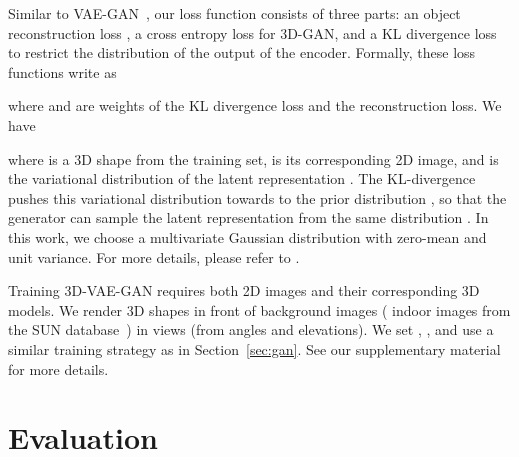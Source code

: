 \documentclass{article}
\newcommand{\sect}[1]{Section~\ref{#1}}
\newcommand{\model}{3D-GAN\xspace}
\newcommand{\vaemodel}{3D-VAE-GAN\xspace}
\newcommand{\presection}{\vspace{-8pt}}
\newcommand{\postsection}{\vspace{-8pt}}
\begin{document}
Similar to VAE-GAN~\citep{larsen2015autoencoding}, our loss function consists of three parts: an object reconstruction loss , a cross entropy loss  for \model, and a KL divergence loss  to restrict the distribution of the output of the encoder. Formally, these loss functions write as 

where  and  are weights of the KL divergence loss and the reconstruction loss. We have

where  is a 3D shape from the training set,  is its corresponding 2D image, and  is the variational distribution of the latent representation . The KL-divergence pushes this variational distribution towards to the prior distribution , so that the generator can sample the latent representation  from the same distribution . In this work, we choose  a multivariate Gaussian distribution with zero-mean and unit variance. For more details, please refer to \cite{larsen2015autoencoding}.

Training \vaemodel requires both 2D images and their corresponding 3D models. We render 3D shapes in front of background images ( indoor images from the SUN database~\citep{SUN}) in  views (from  angles and  elevations). We set , , and use a similar training strategy as in \sect{sec:gan}. See our supplementary material for more details.


\presection
\section{Evaluation}
\label{sec:results}
\postsection
\end{document}

